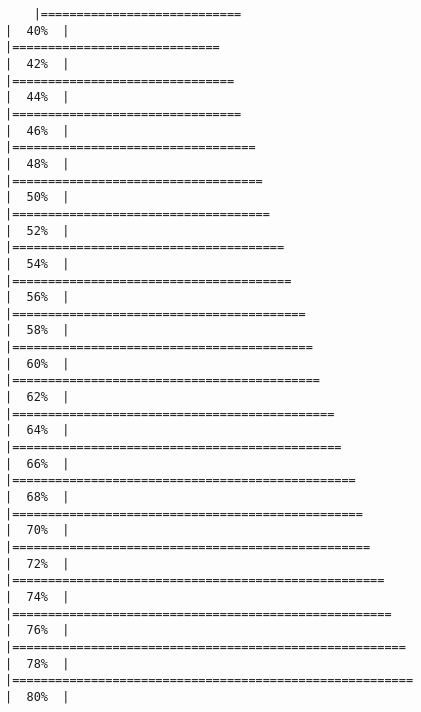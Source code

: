 \documentclass[
]{article}
\begin{document}
\begin{verbatim}
    |============================                                          |  40%  |                                                                              |=============================                                         |  42%  |                                                                              |===============================                                       |  44%  |                                                                              |================================                                      |  46%  |                                                                              |==================================                                    |  48%  |                                                                              |===================================                                   |  50%  |                                                                              |====================================                                  |  52%  |                                                                              |======================================                                |  54%  |                                                                              |=======================================                               |  56%  |                                                                              |=========================================                             |  58%  |                                                                              |==========================================                            |  60%  |                                                                              |===========================================                           |  62%  |                                                                              |=============================================                         |  64%  |                                                                              |==============================================                        |  66%  |                                                                              |================================================                      |  68%  |                                                                              |=================================================                     |  70%  |                                                                              |==================================================                    |  72%  |                                                                              |====================================================                  |  74%  |                                                                              |=====================================================                 |  76%  |                                                                              |=======================================================               |  78%  |                                                                              |========================================================              |  80%  |                                                                           
\end{verbatim}
\end{document}
